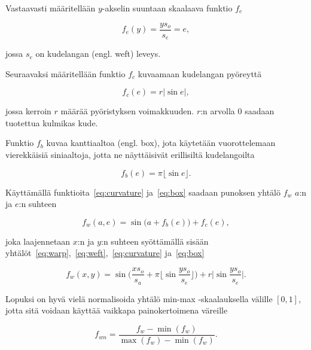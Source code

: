 \documentclass[utf8,bachelor]{gradu3}
\begin{document}
Vastaavasti määritellään $y$-akselin suuntaan skaalaava funktio $f_e$

\begin{equation}
\label{eq:weft}
f_e(y) = \frac{ys_o}{s_e} = e,
\end{equation}

jossa $s_e$ on kudelangan (engl. weft) leveys.

Seuraavaksi määritellään funktio $f_c$ kuvaamaan kudelangan pyöreyttä

\begin{equation}
\label{eq:curvature}
f_c(e) = r\lvert\sin{e}\rvert,
\end{equation}

jossa kerroin $r$ määrää pyöristyksen voimakkuuden. $r$:n arvolla $0$ saadaan tuotettua kulmikas kude.

Funktio $f_b$ kuvaa kanttiaaltoa (engl. box), jota käytetään vuorottelemaan vierekkäisiä siniaaltoja, jotta ne näyttäisivät erillisiltä kudelangoilta

\begin{equation}
\label{eq:box}
f_b(e) = \pi \lfloor \sin{e} \rfloor.
\end{equation}

Käyttämällä funktioita~\eqref{eq:curvature} ja~\eqref{eq:box} saadaan punoksen yhtälö $f_w$ $a$:n ja $e$:n suhteen 

\begin{equation*} 
\label{eq:weave_ae}
f_w(a,e) = \sin{\big(a + f_b(e)\big)} + f_c(e),
\end{equation*}

joka laajennetaan $x$:n ja $y$:n suhteen syöttämällä sisään yhtälöt~\eqref{eq:warp},~\eqref{eq:weft},~\eqref{eq:curvature} ja~\eqref{eq:box}

\begin{equation}
\label{eq:weave_xy}
f_w(x,y) = \sin{\big(\frac{xs_o}{s_a} + \pi \lfloor \sin{\frac{ys_o}{s_e}} \rfloor\big)} + r\lvert\sin{\frac{ys_o}{s_e}}\rvert.
\end{equation}

Lopuksi on hyvä vielä normalisoida yhtälö min-max -skaalauksella välille $\left[0,1\right]$, jotta sitä voidaan käyttää vaikkapa painokertoimena väreille

\begin{equation}
\label{eq:weave_norm}
f_{wn} = \frac{f_w-\min{(f_w)}}{\max{(f_w)}-\min{(f_w)}}.
\end{equation}

\printbibliography 
\end{document}
